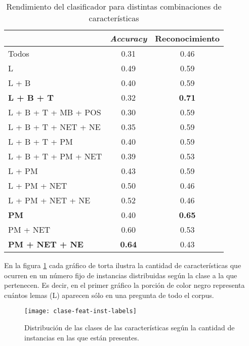 \begin{table}[h!]
\centering
\begin{tabular}{l c c}
     & \textit{Accuracy} & Reconocimiento \\ [0.5ex]
    \hline
    Todos & 0.31 & 0.46 \\[0.5ex]
    L & 0.49 & 0.59 \\ [0.5ex]
    L + B & 0.40 & 0.59 \\ [0.5ex]
    \textbf{L + B + T} & 0.32 & \textbf{0.71} \\[0.5ex]
    L + B + T + MB + POS & 0.30 & 0.59 \\[0.5ex]
    L + B + T + NET + NE & 0.35 & 0.59 \\[0.5ex]
    L + B + T + PM & 0.40 & 0.59 \\[0.5ex]
    L + B + T + PM + NET & 0.39 & 0.53 \\[0.5ex]
    L + PM & 0.43 & 0.59 \\[0.5ex]
    L + PM + NET & 0.50 & 0.46 \\[0.5ex]
    L + PM + NET + NE & 0.52 & 0.46 \\[0.5ex]
    \textbf{PM} & 0.40 & \textbf{0.65} \\[0.5ex]
    PM + NET & 0.60 & 0.53 \\[0.5ex]
    \textbf{PM + NET + NE} & \textbf{0.64} & 0.43 \\[0.5ex]
    \hline
\end{tabular}
\caption{Rendimiento del clasificador para distintas combinaciones de características}\label{tabla-exp3}
\end{table}

En la figura \ref{fig-distribucion-features} cada gráfico de torta ilustra la cantidad de características que ocurren en un número fijo de instancias distribuidas según la clase a la que pertenecen. Es decir, en el primer gráfico la porción de color negro representa cuántos lemas (L) aparecen sólo en una pregunta de todo el corpus.

\begin{figure}[h!]
\centering
\texttt{[image: clase-feat-inst-labels]}
\caption{Distribución de las clases de las características según la cantidad de instancias en las que están presentes.}\label{fig-distribucion-features}
\end{figure}

\vspace{3 mm}

